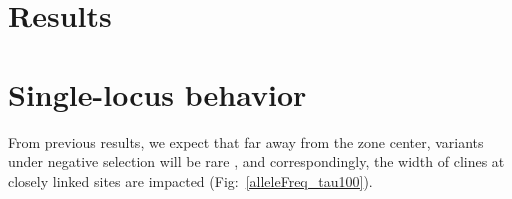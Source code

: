 \documentclass[11pt,letterpaper]{article}
\begin{document}

\section*{Results}

\section*{Single-locus behavior}

From previous results, we expect that far away from the zone center, variants under negative selection will be rare \citep[for demonstration of this theoretical result, see e.g.][]{May1975,Slatkin1973,Barton??}, and correspondingly, the width of clines at closely linked sites are impacted (Fig:~\ref{alleleFreq_tau100}). 
\end{document}
